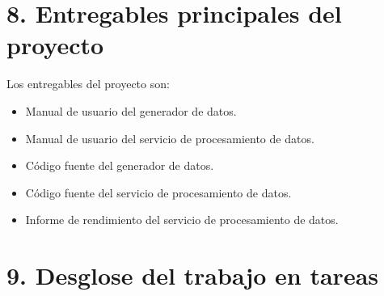 \documentclass[
11pt, %
]{charter}
\begin{document}
\section{8. Entregables principales del proyecto}
\label{sec:entregables}

Los entregables del proyecto son:

\begin{itemize}
	\item Manual de usuario del generador de datos.
	\item Manual de usuario del servicio de procesamiento de datos.
	\item Código fuente del generador de datos.
	\item Código fuente del servicio de procesamiento de datos.
	\item Informe de rendimiento del servicio de procesamiento de datos.
\end{itemize}


\section{9. Desglose del trabajo en tareas}
\label{sec:wbs}
\end{document}
